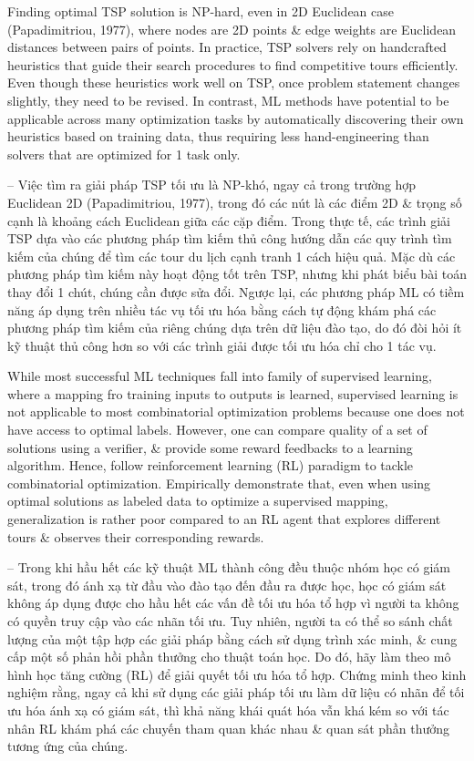 \documentclass{article}
\begin{document}
\begin{itemize}
    Finding optimal TSP solution is NP-hard, even in 2D Euclidean case (Papadimitriou, 1977), where nodes are 2D points \& edge weights are Euclidean distances between pairs of points. In practice, TSP solvers rely on handcrafted heuristics that guide their search procedures to find competitive tours efficiently. Even though these heuristics work well on TSP, once problem statement changes slightly, they need to be revised. In contrast, ML methods have potential to be applicable across many optimization tasks by automatically discovering their own heuristics based on training data, thus requiring less hand-engineering than solvers that are optimized for 1 task only.
    
    -- Việc tìm ra giải pháp TSP tối ưu là NP-khó, ngay cả trong trường hợp Euclidean 2D (Papadimitriou, 1977), trong đó các nút là các điểm 2D \& trọng số cạnh là khoảng cách Euclidean giữa các cặp điểm. Trong thực tế, các trình giải TSP dựa vào các phương pháp tìm kiếm thủ công hướng dẫn các quy trình tìm kiếm của chúng để tìm các tour du lịch cạnh tranh 1 cách hiệu quả. Mặc dù các phương pháp tìm kiếm này hoạt động tốt trên TSP, nhưng khi phát biểu bài toán thay đổi 1 chút, chúng cần được sửa đổi. Ngược lại, các phương pháp ML có tiềm năng áp dụng trên nhiều tác vụ tối ưu hóa bằng cách tự động khám phá các phương pháp tìm kiếm của riêng chúng dựa trên dữ liệu đào tạo, do đó đòi hỏi ít kỹ thuật thủ công hơn so với các trình giải được tối ưu hóa chỉ cho 1 tác vụ.
    
    While most successful ML techniques fall into family of supervised learning, where a mapping fro training inputs to outputs is learned, supervised learning is not applicable to most combinatorial optimization problems because one does not have access to optimal labels. However, one can compare quality of a set of solutions using a verifier, \& provide some reward feedbacks to a learning algorithm. Hence, follow reinforcement learning (RL) paradigm to tackle combinatorial optimization. Empirically demonstrate that, even when using optimal solutions as labeled data to optimize a supervised mapping, generalization is rather poor compared to an RL agent that explores different tours \& observes their corresponding rewards.
    
    -- Trong khi hầu hết các kỹ thuật ML thành công đều thuộc nhóm học có giám sát, trong đó ánh xạ từ đầu vào đào tạo đến đầu ra được học, học có giám sát không áp dụng được cho hầu hết các vấn đề tối ưu hóa tổ hợp vì người ta không có quyền truy cập vào các nhãn tối ưu. Tuy nhiên, người ta có thể so sánh chất lượng của một tập hợp các giải pháp bằng cách sử dụng trình xác minh, \& cung cấp một số phản hồi phần thưởng cho thuật toán học. Do đó, hãy làm theo mô hình học tăng cường (RL) để giải quyết tối ưu hóa tổ hợp. Chứng minh theo kinh nghiệm rằng, ngay cả khi sử dụng các giải pháp tối ưu làm dữ liệu có nhãn để tối ưu hóa ánh xạ có giám sát, thì khả năng khái quát hóa vẫn khá kém so với tác nhân RL khám phá các chuyến tham quan khác nhau \& quan sát phần thưởng tương ứng của chúng.
    

\end{itemize}
\end{document}
